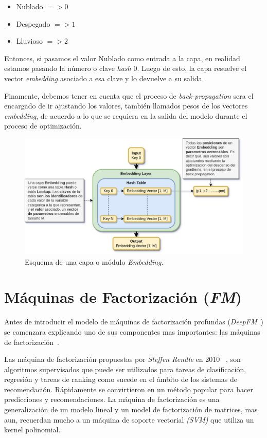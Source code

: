 \documentclass[11pt,a4paper,twoside]{thesis}
\begin{document}
\begin{itemize}
	\item Nublado $=> 0$
	\item Despegado $=> 1$
	\item Lluvioso $=> 2$
\end{itemize}

Entonces, si pasamos el valor Nublado como entrada a la capa, en realidad
estamos pasando la número o clave \textit{hash} $0$. Luego de esto, la capa
resuelve el vector \textit{embedding} asociado a esa clave y lo devuelve a su
salida.

Finamente, debemos tener en cuenta que el proceso de \textit{back-propagation}
sera el encargado de ir ajustando los valores, también llamados pesos de los
vectores \textit{embedding}, de acuerdo a lo que se requiera en la salida del
modelo durante el proceso de optimización.

\begin{figure}[ht!]
	\centering
	\includegraphics[width=13cm]{./images/Embedding-Layer.png}
	\caption{Esquema de una capa o módulo \textit{Embedding}.}
	\label{fig:embeddingLayer}
\end{figure}

\clearpage



\section{Máquinas de Factorización (\textit{FM})}

Antes de introducir el modelo de máquinas de factorización profundas
(\textit{DeepFM}~\cite{dfmpaper, didldfm}) se comenzara explicando uno de sus componentes mas
importantes: las máquinas de factorización~\cite{didlfm, zhangdive}.

Las máquina de factorización propuestas por \textit{Steffen Rendle} en 2010
~\cite{fm}, son algoritmos supervisados que puede ser utilizados para tareas de
clasificación, regresión y tareas de ranking como sucede en el ámbito de los
sistemas de recomendación. Rápidamente se convirtieron en un método popular
para hacer predicciones y recomendaciones. La máquina de factorización es una
generalización de un modelo lineal y un model de factorización de matrices, mas
aun, recuerdan mucho a un máquina de soporte vectorial \textit{(SVM)} que
utiliza un kernel polinomial.
\end{document}
